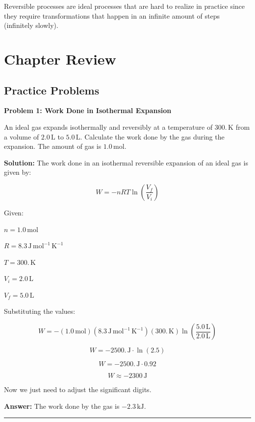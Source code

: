 \documentclass[
  9pt,
]{extbook}
\theoremstyle{definition}
\theoremstyle{definition}
\theoremstyle{definition}
\theoremstyle{definition}
\theoremstyle{remark}
\begin{document}
Reversible processes are ideal processes that are hard to realize in practice since they require transformations that happen in an infinite amount of steps (infinitely slowly).

\section{Chapter Review}\label{rev3}

\subsection{Practice Problems}\label{exer3}

\textbf{Problem 1: Work Done in Isothermal Expansion}

An ideal gas expands isothermally and reversibly at a temperature of \(300. \, \text{K}\) from a volume of \(2.0 \, \text{L}\) to \(5.0 \, \text{L}\). Calculate the work done by the gas during the expansion. The amount of gas is \(1.0 \, \text{mol}\).

\textbf{Solution:} The work done in an isothermal reversible expansion of an ideal gas is given by:

\[ W = -nRT \ln \left(\frac{V_f}{V_i}\right) \]

Given:

\(n = 1.0 \, \text{mol}\)

\(R = 8.3 \, \text{J} \, \text{mol}^{-1} \, \text{K}^{-1}\)

\(T = 300. \, \text{K}\)

\(V_i = 2.0 \, \text{L}\)

\(V_f = 5.0 \, \text{L}\)

Substituting the values:

\[ W = - (1.0\, \text{mol}) (8.3 \, \text{J} \, \text{mol}^{-1} \, \text{K}^{-1}) (300. \, \text{K})  \ln \left(\frac{5.0\, \text{L}}{2.0\, \text{L}}\right) \]

\[ W = -2500.\, \text{J} \cdot \ln \left(2.5\right) \]

\[ W = -2500.\, \text{J} \cdot 0.92 \]

\[ W \approx -2300 \, \text{J} \]

Now we just need to adjust the significant digits.

\textbf{Answer:} The work done by the gas is \(-2.3 \, \text{kJ}\).

\begin{center}\rule{0.5\linewidth}{0.5pt}\end{center}
\end{document}
